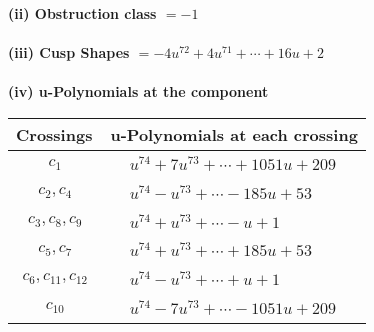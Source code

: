 \documentclass[1p]{elsarticle_modified}
\theoremstyle{definition}
\begin{document}
\flushleft \textbf{(ii) Obstruction class $= -1$}\\~\\
\flushleft \textbf{(iii) Cusp Shapes $= -4 u^{72}+4 u^{71}+\cdots+16 u+2$}\\~\\
\newpage\renewcommand{\arraystretch}{1}
\flushleft \textbf{(iv) u-Polynomials at the component}\newline \\
\begin{tabular}{m{50pt}|m{274pt}}
Crossings & \hspace{64pt}u-Polynomials at each crossing \\
\hline $$\begin{aligned}c_{1}\end{aligned}$$&$\begin{aligned}
&u^{74}+7 u^{73}+\cdots+1051 u+209
\end{aligned}$\\
\hline $$\begin{aligned}c_{2},c_{4}\end{aligned}$$&$\begin{aligned}
&u^{74}- u^{73}+\cdots-185 u+53
\end{aligned}$\\
\hline $$\begin{aligned}c_{3},c_{8},c_{9}\end{aligned}$$&$\begin{aligned}
&u^{74}+u^{73}+\cdots- u+1
\end{aligned}$\\
\hline $$\begin{aligned}c_{5},c_{7}\end{aligned}$$&$\begin{aligned}
&u^{74}+u^{73}+\cdots+185 u+53
\end{aligned}$\\
\hline $$\begin{aligned}c_{6},c_{11},c_{12}\end{aligned}$$&$\begin{aligned}
&u^{74}- u^{73}+\cdots+u+1
\end{aligned}$\\
\hline $$\begin{aligned}c_{10}\end{aligned}$$&$\begin{aligned}
&u^{74}-7 u^{73}+\cdots-1051 u+209
\end{aligned}$\\
\hline
\end{tabular}\\~\\
\end{document}

